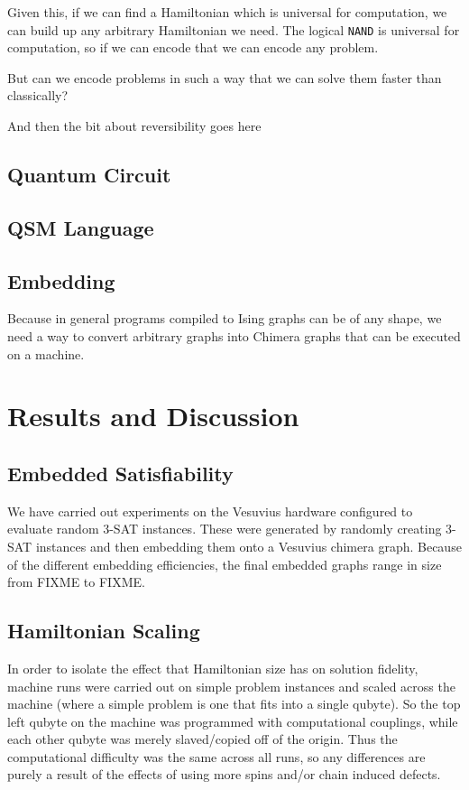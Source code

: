\documentclass{article}
\begin{document}
Given this, if we can find a Hamiltonian which is universal for computation, we can build up any arbitrary Hamiltonian we need.  The logical
{\tt NAND} is universal for computation, so if we can encode that we can encode any problem.

But can we encode problems in such a way that we can solve them faster than classically?

And then the bit about reversibility goes here


\subsection{Quantum Circuit}


\subsection{QSM Language}

\subsection{Embedding}
Because in general programs compiled to Ising graphs can be of any shape, we need a way to convert arbitrary graphs into Chimera graphs that can be executed on a machine.

\section{Results and Discussion}

\subsection{Embedded Satisfiability}

We have carried out experiments on the Vesuvius hardware configured to evaluate random 3-SAT instances.  These were generated by randomly creating 3-SAT instances and then embedding them onto a Vesuvius chimera graph.  Because of the different embedding efficiencies, the final embedded graphs range in size from FIXME to FIXME.  

\subsection{Hamiltonian Scaling}

In order to isolate the effect that Hamiltonian size has on solution fidelity, machine runs were carried out on simple problem instances and scaled across the machine (where a simple problem is one that fits into a single qubyte).  So the top left qubyte on the machine was programmed with computational couplings, while each other qubyte was merely slaved/copied off of the origin.  Thus the computational difficulty was the same across all runs, so any differences are purely a result of the effects of using more spins and/or chain induced defects.
\end{document}
